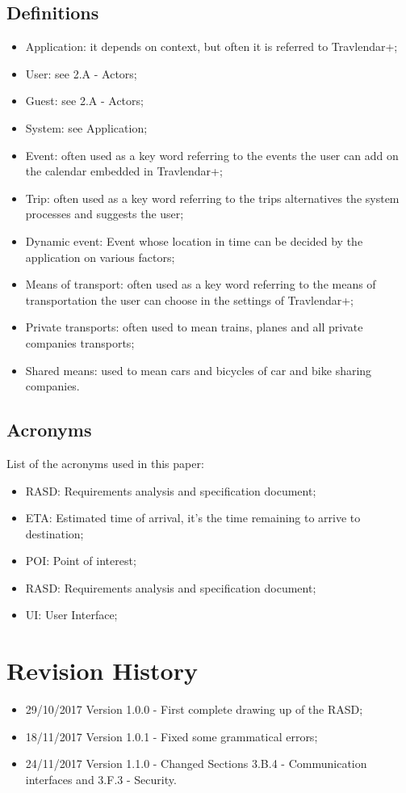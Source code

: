 \subsection{Definitions}
\begin{itemize}
\item Application: it depends on context, but often it is referred to Travlendar+;
\item User: see 2.A - Actors;
\item Guest: see 2.A - Actors;
\item System: see Application;
\item Event: often used as a key word referring to the events the user can add on the calendar embedded in Travlendar+;
\item Trip: often used as a key word referring to the trips alternatives the system processes and suggests the user;
\item Dynamic event: Event whose location in time can be decided by the application on various factors;
\item Means of transport: often used as a key word referring to the means of transportation the user can choose in the settings of Travlendar+;
\item Private transports: often used to mean trains, planes and all private companies transports;
\item Shared means: used to mean cars and bicycles of car and bike sharing companies.
\end{itemize}
%
\subsection{Acronyms}
List of the acronyms used in this paper:
\begin{itemize}
\item RASD: Requirements analysis and specification document;
\item ETA: Estimated time of arrival, it's the time remaining to arrive to destination;
\item POI: Point of interest;
\item RASD: Requirements analysis and specification document;
\item UI: User Interface;
\end{itemize}
%
%
\section{Revision History}
\begin{itemize}
\item 29/10/2017 Version 1.0.0 - First complete drawing up of the RASD;
\item 18/11/2017 Version 1.0.1 - Fixed some grammatical errors;
\item 24/11/2017 Version 1.1.0 - Changed Sections 3.B.4 - Communication interfaces and 3.F.3 - Security.
\end{itemize}
%
%
